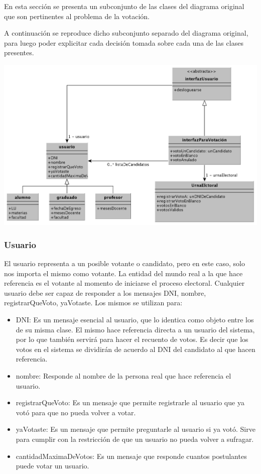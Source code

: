 
En esta secci\'on se presenta un subconjunto de las clases del diagrama original que son pertinentes al problema de la votaci\'on.

A continuaci\'on se reproduce dicho subconjunto separado del diagrama original, para luego poder explicitar cada decisi\'on tomada sobre cada una de las clases presentes.

\begin{center}
\includegraphics[scale=0.3]{diagramas/modeloDeClasesVotacion.png}
\end{center}

\subsubsection{Usuario}

El usuario representa a un posible votante o candidato, pero en este caso, solo nos importa el mismo como votante. La entidad del mundo real a la que hace referencia es el votante al momento de iniciarse el proceso electoral. Cualquier usuario debe ser capaz de responder a los mensajes DNI, nombre, registrarQueVoto, yaVotaste. Los mismos se utilizan para:

\begin{itemize}
\item DNI: Es un mensaje esencial al usuario, que lo identica como objeto entre los de su misma clase. El mismo hace referencia directa a un usuario del sistema, por lo que tambi\'en servir\'a para hacer el recuento de votos. Es decir que los votos en el sistema se dividir\'an de acuerdo al DNI del candidato al que hacen referencia.
\item nombre: Responde al nombre de la persona real que hace referencia el usuario.
\item registrarQueVoto: Es un mensaje que permite registrarle al usuario que ya vot\'o para que no pueda volver a votar.
\item yaVotaste: Es un mensaje que permite preguntarle al usuario si ya vot\'o. Sirve para cumplir con la restricci\'on de que un usuario no pueda volver a sufragar.
\item cantidadMaximaDeVotos: Es un mensaje que responde cuantos postulantes puede votar un usuario.
\end{itemize}

